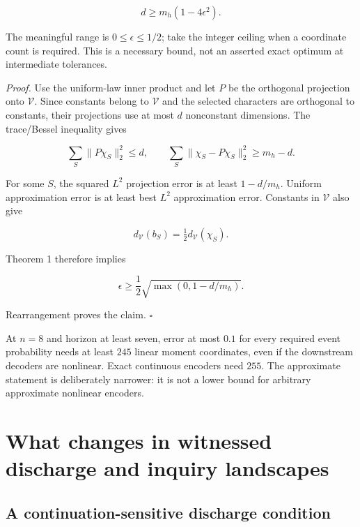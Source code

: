 \documentclass[11pt,a4paper]{article}
\begin{document}
\nopagebreak[4]

\[
\boxed{d\ge m_h(1-4\epsilon^2).}
\]

The meaningful range is \(0\le\epsilon\le1/2\); take the integer ceiling
when a coordinate count is required. This is a necessary bound, not an
asserted exact optimum at intermediate tolerances.

\emph{Proof.} Use the uniform-law inner product and let \(P\) be the
orthogonal projection onto \(\mathscr V\). Since constants belong to
\(\mathscr V\) and the selected characters are orthogonal to constants,
their projections use at most \(d\) nonconstant dimensions. The
trace/Bessel inequality gives

\nopagebreak[4]

\[
\sum_{S}\|P\chi_S\|_2^2\le d,
\qquad
\sum_S\|\chi_S-P\chi_S\|_2^2\ge m_h-d.
\]

For some \(S\), the squared \(L^2\) projection error is at least
\(1-d/m_h\). Uniform approximation error is at least best \(L^2\)
approximation error. Constants in \(\mathscr V\) also give

\nopagebreak[4]

\[
d_{\mathscr V}(b_S)=\tfrac12d_{\mathscr V}(\chi_S).
\]


Theorem 1 therefore implies

\nopagebreak[4]

\[
\epsilon\ge\frac12\sqrt{\max(0,1-d/m_h)}.
\]

Rearrangement proves the claim. \(\square\)

At \(n=8\) and horizon at least seven, error at most \(0.1\) for every
required event probability needs at least \(245\) linear moment
coordinates, even if the downstream decoders are nonlinear. Exact
continuous encoders need \(255\). The approximate statement is
deliberately narrower: it is not a lower bound for arbitrary approximate
nonlinear encoders.

\section{What changes in witnessed discharge and inquiry
landscapes}\label{what-changes-in-witnessed-discharge-and-inquiry-landscapes}

\subsection{A continuation-sensitive discharge
condition}\label{a-continuation-sensitive-discharge-condition}
\end{document}
